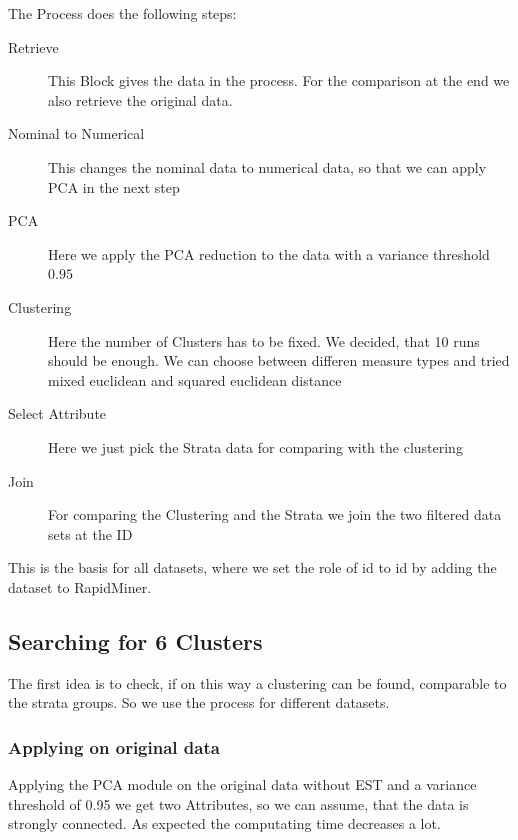 The Process does the following steps:
\begin{description}
	\item[Retrieve] This Block gives the data in the process. For the comparison at the end we also retrieve the original data.
	\item[Nominal to Numerical] This changes the nominal data to numerical data, so that we can apply PCA in the next step
	\item[PCA] Here we apply the PCA reduction to the data with a variance threshold $0.95$
	\item[Clustering] Here the number of Clusters has to be fixed. We decided, that 10 runs should be enough. We can choose between differen measure types and tried mixed euclidean and squared euclidean distance
	\item[Select Attribute] Here we just pick the Strata data for comparing with the clustering
	\item[Join] For comparing the Clustering and the Strata we join the two filtered data sets at the ID
\end{description}

This is the basis for all datasets, where we set the role of id to id by adding the dataset to RapidMiner.

\subsection{Searching for 6 Clusters}

The first idea is to check, if on this way a clustering can be found, comparable to the strata groups. So we use the process for different datasets.

\subsubsection{Applying on original data}
Applying the PCA module on the original data without EST and a variance
threshold of 0.95 we get two Attributes, so we can assume, that the data is strongly connected. As expected the computating time decreases a lot. 


